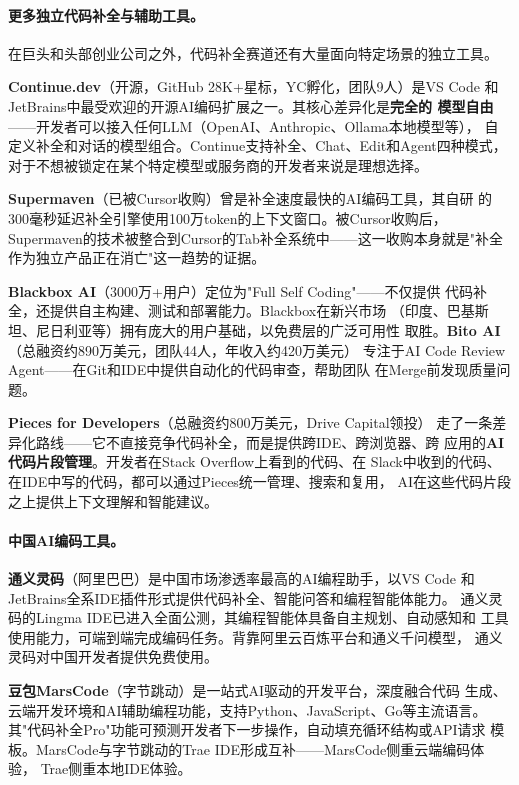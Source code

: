 \paragraph{更多独立代码补全与辅助工具。}
在巨头和头部创业公司之外，代码补全赛道还有大量面向特定场景的独立工具。

\textbf{Continue.dev}（开源，GitHub 28K+星标，YC孵化，团队9人）是VS Code
和JetBrains中最受欢迎的开源AI编码扩展之一。其核心差异化是\textbf{完全的
模型自由}——开发者可以接入任何LLM（OpenAI、Anthropic、Ollama本地模型等），
自定义补全和对话的模型组合。Continue支持补全、Chat、Edit和Agent四种模式，
对于不想被锁定在某个特定模型或服务商的开发者来说是理想选择。

\textbf{Supermaven}（已被Cursor收购）曾是补全速度最快的AI编码工具，其自研
的300毫秒延迟补全引擎使用100万token的上下文窗口。被Cursor收购后，
Supermaven的技术被整合到Cursor的Tab补全系统中——这一收购本身就是"补全
作为独立产品正在消亡"这一趋势的证据。

\textbf{Blackbox AI}（3000万+用户）定位为"Full Self Coding"——不仅提供
代码补全，还提供自主构建、测试和部署能力。Blackbox在新兴市场
（印度、巴基斯坦、尼日利亚等）拥有庞大的用户基础，以免费层的广泛可用性
取胜。\textbf{Bito AI}（总融资约890万美元，团队44人，年收入约420万美元）
专注于AI Code Review Agent——在Git和IDE中提供自动化的代码审查，帮助团队
在Merge前发现质量问题。

\textbf{Pieces for Developers}（总融资约800万美元，Drive Capital领投）
走了一条差异化路线——它不直接竞争代码补全，而是提供跨IDE、跨浏览器、跨
应用的\textbf{AI代码片段管理}。开发者在Stack Overflow上看到的代码、在
Slack中收到的代码、在IDE中写的代码，都可以通过Pieces统一管理、搜索和复用，
AI在这些代码片段之上提供上下文理解和智能建议。

\paragraph{中国AI编码工具。}
\textbf{通义灵码}（阿里巴巴）是中国市场渗透率最高的AI编程助手，以VS Code
和JetBrains全系IDE插件形式提供代码补全、智能问答和编程智能体能力。
通义灵码的Lingma IDE已进入全面公测，其编程智能体具备自主规划、自动感知和
工具使用能力，可端到端完成编码任务。背靠阿里云百炼平台和通义千问模型，
通义灵码对中国开发者提供免费使用。

\textbf{豆包MarsCode}（字节跳动）是一站式AI驱动的开发平台，深度融合代码
生成、云端开发环境和AI辅助编程功能，支持Python、JavaScript、Go等主流语言。
其"代码补全Pro"功能可预测开发者下一步操作，自动填充循环结构或API请求
模板。MarsCode与字节跳动的Trae IDE形成互补——MarsCode侧重云端编码体验，
Trae侧重本地IDE体验。

